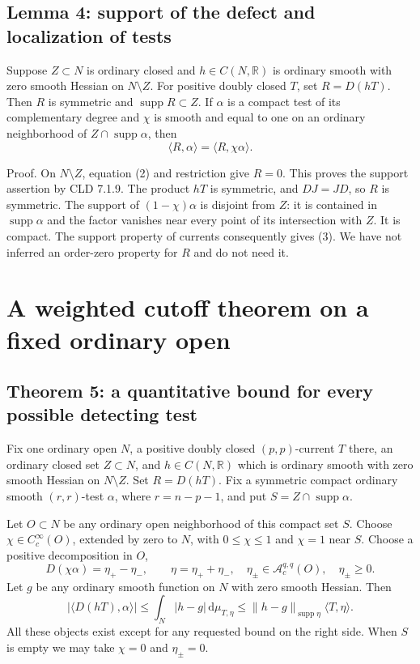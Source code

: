 \documentclass[11pt]{article}
\begin{document}
\subsection{Lemma 4: support of the defect and localization of tests}

Suppose \(Z\subset N\) is ordinary closed and \(h\in C(N,\mathbb R)\) is ordinary smooth with zero smooth Hessian on \(N\setminus Z\). For positive doubly closed \(T\), set \(R=D(hT)\). Then \(R\) is symmetric and \(\operatorname{supp}R\subset Z\). If \(\alpha\) is a compact test of its complementary degree and \(\chi\) is smooth and equal to one on an ordinary neighborhood of \(Z\cap\operatorname{supp}\alpha\), then
\[
 \langle R,\alpha\rangle=\langle R,\chi\alpha\rangle.\tag{3}
\]

Proof. On \(N\setminus Z\), equation (2) and restriction give \(R=0\). This proves the support assertion by CLD 7.1.9. The product \(hT\) is symmetric, and \(DJ=JD\), so \(R\) is symmetric. The support of \((1-\chi)\alpha\) is disjoint from \(Z\): it is contained in \(\operatorname{supp}\alpha\) and the factor vanishes near every point of its intersection with \(Z\). It is compact. The support property of currents consequently gives (3). We have not inferred an order-zero property for \(R\) and do not need it.


\section{A weighted cutoff theorem on a fixed ordinary open}

\subsection{Theorem 5: a quantitative bound for every possible detecting test}

Fix one ordinary open \(N\), a positive doubly closed \((p,p)\)-current \(T\) there, an ordinary closed set \(Z\subset N\), and \(h\in C(N,\mathbb R)\) which is ordinary smooth with zero smooth Hessian on \(N\setminus Z\). Set \(R=D(hT)\). Fix a symmetric compact ordinary smooth \((r,r)\)-test \(\alpha\), where \(r=n-p-1\), and put \(S=Z\cap\operatorname{supp}\alpha\).

Let \(O\subset N\) be any ordinary open neighborhood of this compact set \(S\). Choose \(\chi\in C_c^\infty(O)\), extended by zero to \(N\), with \(0\leq\chi\leq1\) and \(\chi=1\) near \(S\). Choose a positive decomposition in \(O\),
\[
 D(\chi\alpha)=\eta_+-\eta_-,\qquad \eta=\eta_++\eta_-,\quad
 \eta_\pm\in\mathcal A_c^{q,q}(O),\quad \eta_\pm\geq0.\tag{4}
\]
Let \(g\) be any ordinary smooth function on \(N\) with zero smooth Hessian. Then
\[
 |\langle D(hT),\alpha\rangle|
 \leq\int_N|h-g|\,\mathrm d\mu_{T,\eta}
 \leq\|h-g\|_{\operatorname{supp}\eta}\langle T,\eta\rangle.\tag{5}
\]
All these objects exist except for any requested bound on the right side. When \(S\) is empty we may take \(\chi=0\) and \(\eta_\pm=0\).
\end{document}
